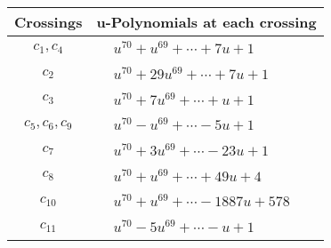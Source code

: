 \documentclass[1p]{elsarticle_modified}
\theoremstyle{definition}
\begin{document}
\begin{tabular}{m{50pt}|m{274pt}}
Crossings & \hspace{64pt}u-Polynomials at each crossing \\
\hline $$\begin{aligned}c_{1},c_{4}\end{aligned}$$&$\begin{aligned}
&u^{70}+u^{69}+\cdots+7 u+1
\end{aligned}$\\
\hline $$\begin{aligned}c_{2}\end{aligned}$$&$\begin{aligned}
&u^{70}+29 u^{69}+\cdots+7 u+1
\end{aligned}$\\
\hline $$\begin{aligned}c_{3}\end{aligned}$$&$\begin{aligned}
&u^{70}+7 u^{69}+\cdots+u+1
\end{aligned}$\\
\hline $$\begin{aligned}c_{5},c_{6},c_{9}\end{aligned}$$&$\begin{aligned}
&u^{70}- u^{69}+\cdots-5 u+1
\end{aligned}$\\
\hline $$\begin{aligned}c_{7}\end{aligned}$$&$\begin{aligned}
&u^{70}+3 u^{69}+\cdots-23 u+1
\end{aligned}$\\
\hline $$\begin{aligned}c_{8}\end{aligned}$$&$\begin{aligned}
&u^{70}+u^{69}+\cdots+49 u+4
\end{aligned}$\\
\hline $$\begin{aligned}c_{10}\end{aligned}$$&$\begin{aligned}
&u^{70}+u^{69}+\cdots-1887 u+578
\end{aligned}$\\
\hline $$\begin{aligned}c_{11}\end{aligned}$$&$\begin{aligned}
&u^{70}-5 u^{69}+\cdots- u+1
\end{aligned}$\\
\hline
\end{tabular}\\~\\
\end{document}
